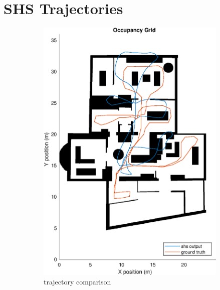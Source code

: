 \chapter{SHS Trajectories}




\begin{figure}[H]
	\centering
	\begin{subfigure}[t]{.45\textwidth}
		\centering
		\includegraphics[width=0.9\linewidth]{images/20201029_1042_trial2_shs_1}
		\caption{trajectory comparison}
		\label{fig:trial2_on_map}
	\end{subfigure}
	\begin{subfigure}[t]{.45\textwidth}
		\centering

\end{subfigure}
\end{figure}
